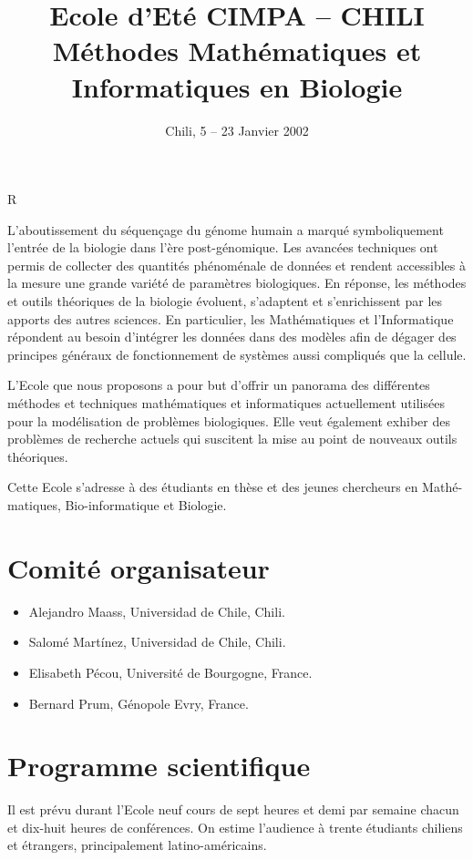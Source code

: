 \documentclass{amsart}
\title{Ecole d'Et\'e CIMPA -- CHILI\\ M\'ethodes Math\'ematiques et
Informatiques en Biologie}
\author{Chili, 5 -- 23 Janvier 2002}
\begin{document}
\maketitle
\centerline{R}

\vskip 0.2cm
{\rm L'aboutissement du s\'equen\c{c}age du g\'enome humain a marqu\'e
symboliquement l'entr\'ee de la biologie dans l'\`ere post-g\'enomique.
Les avanc\'ees techniques ont permis  de collecter des quantit\'es
ph\'enom\'enale de donn\'ees et rendent accessibles \`a la mesure une
grande vari\'et\'e de param\`etres biologiques. En r\'eponse, les
m\'ethodes et outils th\'eoriques de la biologie \'evoluent, s'adaptent
et s'enrichissent par les apports des autres sciences. En particulier,
les Math\'ematiques et l'Informatique  r\'epondent au besoin
d'int\'egrer les donn\'ees dans des mod\`eles afin de d\'egager des
principes g\'en\'eraux de fonctionnement de syst\`emes aussi
compliqu\'es que la cellule.

L'Ecole que nous proposons  a pour but d'offrir un panorama des
diff\'erentes m\'ethodes et techniques  math\'ematiques et informatiques
actuellement utilis\'ees pour la mod\'elisation de probl\`emes
biologiques. Elle veut \'egalement exhiber des probl\`emes de recherche
actuels qui suscitent la mise au point de nouveaux outils th\'eoriques.

Cette Ecole s'adresse \`a des \'etudiants en  th\`ese et des jeunes
chercheurs en Math\'e-\\matiques, Bio-informatique et Biologie.}

\vskip 0.5cm

\section{Comit\'e organisateur}
\begin{itemize}
\item Alejandro Maass, Universidad de Chile, Chili.
\item Salom\'e Mart\'inez, Universidad de Chile, Chili.
\item Elisabeth P\'ecou, Universit\'e de Bourgogne, France.
\item Bernard Prum, G\'enopole Evry, France.
\end{itemize}

\section{Programme scientifique}
Il est pr\'evu durant l'Ecole neuf cours de sept heures et demi par
semaine
chacun et dix-huit heures de conf\'erences. On estime l'audience
\`a trente \'etudiants chiliens et \'etrangers,
principalement latino-am\'ericains.
\end{document}
